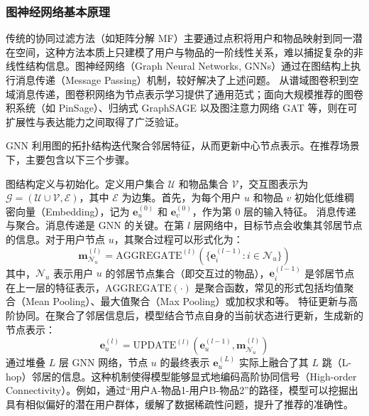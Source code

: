 \subsubsection{图神经网络基本原理}
传统的协同过滤方法（如矩阵分解 MF）主要通过点积将用户和物品映射到同一潜在空间，这种方法本质上只建模了用户与物品的一阶线性关系，难以捕捉复杂的非线性结构信息。图神经网络（Graph Neural Networks, GNNs）通过在图结构上执行消息传递（Message Passing）机制，较好解决了上述问题\cite{wu2021fedgnn, he2020lightgcn}。
从谱域图卷积到空域消息传递，图卷积网络为节点表示学习提供了通用范式\cite{kipf2016semi}；面向大规模推荐的图卷积系统（如 PinSage）、归纳式 GraphSAGE 以及图注意力网络 GAT 等，则在可扩展性与表达能力之间取得了广泛验证\cite{ying2018pinsage,hamilton2017graphsage,velickovic2018gat}。

GNN 利用图的拓扑结构迭代聚合邻居特征，从而更新中心节点表示。在推荐场景下，主要包含以下三个步骤。
\begin{cnenumerate}
    \cnitem 图结构定义与初始化。定义用户集合 $\mathcal{U}$ 和物品集合 $\mathcal{V}$，交互图表示为 $\mathcal{G} = (\mathcal{U} \cup \mathcal{V}, \mathcal{E})$，其中 $\mathcal{E}$ 为边集。首先，为每个用户 $u$ 和物品 $v$ 初始化低维稠密向量（Embedding），记为 $\mathbf{e}_u^{(0)}$ 和 $\mathbf{e}_v^{(0)}$，作为第 0 层的输入特征。
    \cnitem 消息传递与聚合。消息传递是 GNN 的关键。在第 $l$ 层网络中，目标节点会收集其邻居节点的信息。对于用户节点 $u$，其聚合过程可以形式化为：
\begin{equation}
    \mathbf{m}_{\mathcal{N}_u}^{(l)} = \text{AGGREGATE}^{(l)} \left( \{ \mathbf{e}_i^{(l-1)} : i \in \mathcal{N}_u \} \right) 
    \label{eq:gnn_agg}
\end{equation}
其中，$\mathcal{N}_u$ 表示用户 $u$ 的邻居节点集合（即交互过的物品），$\mathbf{e}_i^{(l-1)}$ 是邻居节点在上一层的特征表示，$\text{AGGREGATE}(\cdot)$ 是聚合函数，常见的形式包括均值聚合（Mean Pooling）、最大值聚合（Max Pooling）或加权求和等。
    \cnitem 特征更新与高阶协同。在聚合了邻居信息后，模型结合节点自身的当前状态进行更新，生成新的节点表示：
\begin{equation}
    \mathbf{e}_u^{(l)} = \text{UPDATE}^{(l)} \left( \mathbf{e}_u^{(l-1)}, \mathbf{m}_{\mathcal{N}_u}^{(l)} \right)
    \label{eq:gnn_update}
\end{equation}
通过堆叠 $L$ 层 GNN 网络，节点 $u$ 的最终表示 $\mathbf{e}_u^{(L)}$ 实际上融合了其 $L$ 跳（L-hop）邻居的信息。这种机制使得模型能够显式地编码高阶协同信号（High-order Connectivity）。例如，通过“用户A-物品1-用户B-物品2”的路径，模型可以挖掘出具有相似偏好的潜在用户群体，缓解了数据稀疏性问题，提升了推荐的准确性\cite{wang2019kgat}。
\end{cnenumerate}

